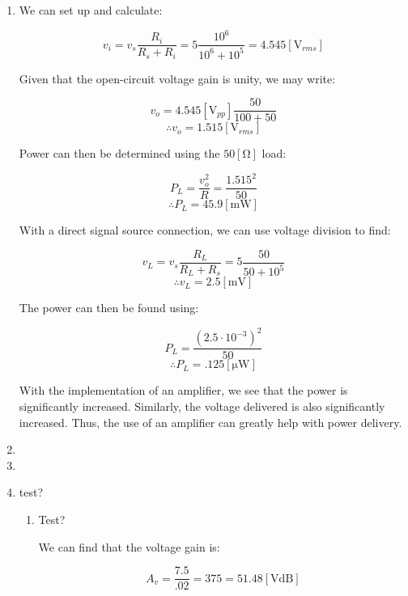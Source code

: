 \begin{enumerate}

  \item

    \begin{center}
      We can set up and calculate:
    \end{center}
    $$v_i=v_s\frac{R_i}{R_s+R_i}=5\frac{10^6}{10^6+10^5}=4.545[\si{\volt}_{rms}]$$
    \begin{center}
      Given that the open-circuit voltage gain is unity, we may write:
    \end{center}
    $$v_o=4.545[\si{\volt}_{pp}]\frac{50}{100+50}$$
    $$\boxed{\therefore v_o=1.515[\si{\volt}_{rms}]}$$

    \begin{center}
      Power can then be determined using the $50[\si{\ohm}]$ load:
    \end{center}
    $$P_L=\frac{v_o^2}{R}=\frac{1.515^2}{50}$$
    $$\boxed{\therefore P_L=45.9[\si{\milli\watt}]}$$

    \begin{center}
      With a direct signal source connection, we can use voltage division to find:
    \end{center}
    $$v_L=v_s\frac{R_L}{R_L+R_s}=5\frac{50}{50+10^5}$$
    $$\boxed{\therefore v_L=2.5[\si{\milli\volt}]}$$

    \begin{center}
      The power can then be found using:
    \end{center}
    $$P_L=\frac{(2.5\cdot10^{-3})^2}{50}$$
    $$\boxed{\therefore P_L=.125[\si{\micro\watt}]}$$

    With the implementation of an amplifier, we see that the power is significantly increased. Similarly, the voltage delivered is also significantly increased. Thus, the use of an amplifier can greatly help with power delivery.

  \item

  \item

  \item test?

    \begin{enumerate}

      \item Test?

        \begin{center}
          We can find that the voltage gain is:
        \end{center}
        $$\boxed{A_{v}=\frac{7.5}{.02}=375=51.48[\si{\volt}\text{dB}]}$$


\end{enumerate}
\end{enumerate}
